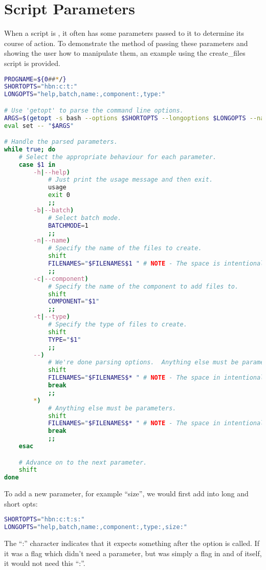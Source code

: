 \documentclass[a4paper, oneside, 11pt, titlepage, onecolumn, openright]{report}
\begin{document}
\section{Script Parameters}
			\label{s:ScriptParameters}
			
			When a script is , it often has some parameters passed to it to determine its course of action. To demonstrate the method of passing these parameters and showing the user how to manipulate them, an example using the create\_files script is provided.
\begin{lstlisting}[frame=trBL, breaklines=true, language = bash]
PROGNAME=${0##*/} 
SHORTOPTS="hbn:c:t:"
LONGOPTS="help,batch,name:,component:,type:"

# Use 'getopt' to parse the command line options.
ARGS=$(getopt -s bash --options $SHORTOPTS --longoptions $LONGOPTS --name $PROGNAME -- "$@")
eval set -- "$ARGS"

# Handle the parsed parameters.
while true; do
	# Select the appropriate behaviour for each parameter.
	case $1 in
		-h|--help)
			# Just print the usage message and then exit.
			usage
			exit 0
			;;
		-b|--batch)
			# Select batch mode.
			BATCHMODE=1
			;;
		-n|--name)
			# Specify the name of the files to create.
			shift
			FILENAMES="$FILENAMES$1 " # NOTE - The space is intentional!
			;;
		-c|--component)
			# Specify the name of the component to add files to.
			shift
			COMPONENT="$1"
			;;
		-t|--type)
			# Specify the type of files to create.
			shift
			TYPE="$1"
			;;
		--)
			# We're done parsing options.  Anything else must be parameters.
			shift
			FILENAMES="$FILENAMES$* " # NOTE - The space in intentional!
			break
			;;
		*)
			# Anything else must be parameters.
			shift
			FILENAMES="$FILENAMES$* " # NOTE - The space in intentional!
			break
			;;
	esac

	# Advance on to the next parameter.
	shift
done
\end{lstlisting}

To add a new parameter, for example ``size'', we would first add into long and short opts:

\begin{lstlisting}[frame=trBL, breaklines=true, language = bash]
SHORTOPTS="hbn:c:t:s:"
LONGOPTS="help,batch,name:,component:,type:,size:"
\end{lstlisting}

The ``:'' character indicates that it expects something after the option is called. If it was a flag which didn't need a parameter, but was simply a flag in and of itself, it would not need this ``:''.
\end{document}

